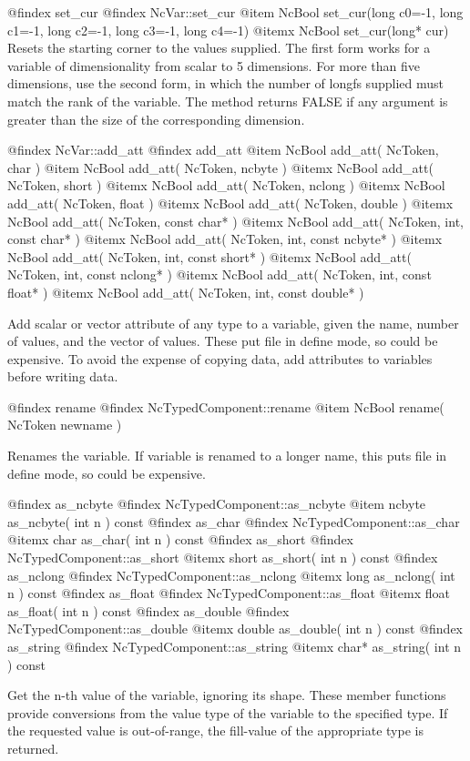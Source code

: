 @findex set_cur
@findex NcVar::set_cur
@item NcBool set_cur(long c0=-1, long c1=-1, long c2=-1, long c3=-1, long c4=-1)
@itemx NcBool set_cur(long* cur)
Resets the starting corner to the values supplied.  The first form works
for a variable of dimensionality from scalar to 5 dimensions.  For more
than five dimensions, use the second form, in which the number of longfs
supplied must match the rank of the variable.  The method returns FALSE if
any argument is greater than the size of the corresponding dimension.

@findex NcVar::add_att
@findex add_att
@item  NcBool add_att( NcToken, char )
@item  NcBool add_att( NcToken, ncbyte )
@itemx NcBool add_att( NcToken, short )
@itemx NcBool add_att( NcToken, nclong )
@itemx NcBool add_att( NcToken, float )
@itemx NcBool add_att( NcToken, double )
@itemx NcBool add_att( NcToken, const char* )
@itemx NcBool add_att( NcToken, int, const char* )
@itemx NcBool add_att( NcToken, int, const ncbyte* )
@itemx NcBool add_att( NcToken, int, const short* )
@itemx NcBool add_att( NcToken, int, const nclong* )
@itemx NcBool add_att( NcToken, int, const float* )
@itemx NcBool add_att( NcToken, int, const double* )

Add scalar or vector attribute of any type to a variable, given the
name, number of values, and the vector of values.  These put file in
define mode, so could be expensive.  To avoid the expense of copying
data, add attributes to variables before writing data.

@findex rename
@findex NcTypedComponent::rename
@item NcBool rename( NcToken newname )

Renames the variable.  If variable is renamed to a longer name, this
puts file in define mode, so could be expensive.

@findex as_ncbyte
@findex NcTypedComponent::as_ncbyte
@item ncbyte as_ncbyte( int n ) const
@findex as_char
@findex NcTypedComponent::as_char
@itemx char as_char( int n ) const
@findex as_short
@findex NcTypedComponent::as_short
@itemx short as_short( int n ) const
@findex as_nclong
@findex NcTypedComponent::as_nclong
@itemx long as_nclong( int n ) const
@findex as_float
@findex NcTypedComponent::as_float
@itemx float as_float( int n ) const
@findex as_double
@findex NcTypedComponent::as_double
@itemx double as_double( int n ) const
@findex as_string
@findex NcTypedComponent::as_string
@itemx char* as_string( int n ) const

Get the n-th value of the variable, ignoring its shape.  These member
functions provide conversions from the value type of the variable to the
specified type.  If the requested value is out-of-range, the fill-value of the
appropriate type is returned.

